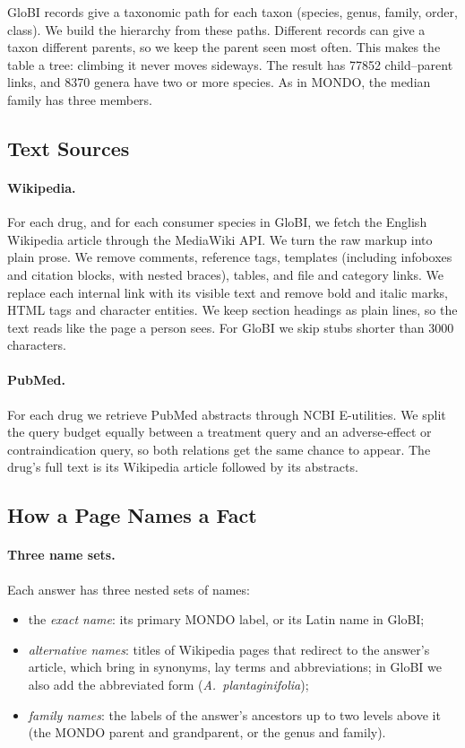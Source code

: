 GloBI records give a taxonomic path for each taxon (species, genus, family, order, class). We build the hierarchy from these paths. Different records can give a taxon different parents, so we keep the parent seen most often. This makes the table a tree: climbing it never moves sideways. The result has \num{77852} child--parent links, and \num{8370} genera have two or more species. As in MONDO, the median family has three members.

\subsection{Text Sources}

\paragraph{Wikipedia.}
For each drug, and for each consumer species in GloBI, we fetch the English Wikipedia article through the MediaWiki API. We turn the raw markup into plain prose. We remove comments, reference tags, templates (including infoboxes and citation blocks, with nested braces), tables, and file and category links. We replace each internal link with its visible text and remove bold and italic marks, HTML tags and character entities. We keep section headings as plain lines, so the text reads like the page a person sees. For GloBI we skip stubs shorter than \num{3000} characters.

\paragraph{PubMed.}
For each drug we retrieve PubMed abstracts through NCBI E-utilities. We split the query budget equally between a treatment query and an adverse-effect or contraindication query, so both relations get the same chance to appear. The drug's full text is its Wikipedia article followed by its abstracts.

\subsection{How a Page Names a Fact}

\paragraph{Three name sets.}
Each answer has three nested sets of names:
\begin{itemize}
\item the \emph{exact name}: its primary MONDO label, or its Latin name in GloBI;
\item \emph{alternative names}: titles of Wikipedia pages that redirect to the answer's article, which bring in synonyms, lay terms and abbreviations; in GloBI we also add the abbreviated form (\emph{A.~plantaginifolia});
\item \emph{family names}: the labels of the answer's ancestors up to two levels above it (the MONDO parent and grandparent, or the genus and family).
\end{itemize}

